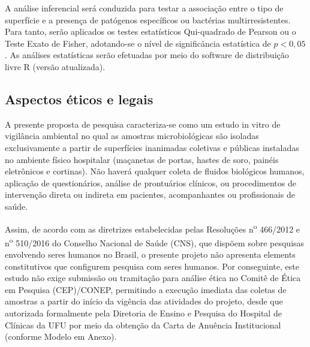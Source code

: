 \documentclass[12pt,a4paper]{article}
\begin{document}
A análise inferencial será conduzida para testar a associação entre o tipo de superfície e a presença de patógenos específicos ou bactérias multirresistentes. Para tanto, serão aplicados os testes estatísticos Qui-quadrado de Pearson ou o Teste Exato de Fisher, adotando-se o nível de significância estatística de $p < 0,05$. As análises estatísticas serão efetuadas por meio do software de distribuição livre R (versão atualizada).

\subsection{Aspectos éticos e legais}
A presente proposta de pesquisa caracteriza-se como um estudo in vitro de vigilância ambiental no qual as amostras microbiológicas são isoladas exclusivamente a partir de superfícies inanimadas coletivas e públicas instaladas no ambiente físico hospitalar (maçanetas de portas, hastes de soro, painéis eletrônicos e cortinas). Não haverá qualquer coleta de fluidos biológicos humanos, aplicação de questionários, análise de prontuários clínicos, ou procedimentos de intervenção direta ou indireta em pacientes, acompanhantes ou profissionais de saúde.

Assim, de acordo com as diretrizes estabelecidas pelas Resoluções n\textsuperscript{o} 466/2012 e n\textsuperscript{o} 510/2016 do Conselho Nacional de Saúde (CNS), que dispõem sobre pesquisas envolvendo seres humanos no Brasil, o presente projeto não apresenta elements constitutivos que configurem pesquisa com seres humanos. Por conseguinte, este estudo não exige submissão ou tramitação para análise ética no Comitê de Ética em Pesquisa (CEP)/CONEP, permitindo a execução imediata das coletas de amostras a partir do início da vigência das atividades do projeto, desde que autorizada formalmente pela Diretoria de Ensino e Pesquisa do Hospital de Clínicas da UFU por meio da obtenção da Carta de Anuência Institucional (conforme Modelo em Anexo).
\newpage

\end{document}
